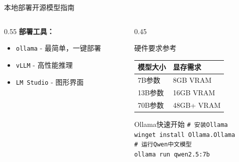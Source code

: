 \documentclass[aspectratio=169,11pt]{beamer}
\begin{document}
\begin{frame}{本地部署开源模型指南}
\begin{columns}
\begin{column}{0.55\textwidth}
            \vspace{0.3cm}
            \textbf{部署工具：}
            \begin{itemize}
                \item \texttt{ollama} - 最简单，一键部署
                \item \texttt{vLLM} - 高性能推理
                \item \texttt{LM Studio} - 图形界面
            \end{itemize}
        \end{column}
        \begin{column}{0.45\textwidth}
            \begin{block}{硬件要求参考}
                \small
                \begin{tabular}{ll}
                    \textbf{模型大小} & \textbf{显存需求} \\
                    \midrule
                    7B参数 & 8GB VRAM \\
                    13B参数 & 16GB VRAM \\
                    70B参数 & 48GB+ VRAM \\
                \end{tabular}
            \end{block}
            
            \vspace{0.3cm}
            \begin{exampleblock}{Ollama快速开始}
                \small
                \texttt{\# 安装Ollama}\\
                \texttt{winget install Ollama.Ollama}\\
                \vspace{0.1cm}
                \texttt{\# 运行Qwen中文模型}\\
                \texttt{ollama run qwen2.5:7b}
            \end{exampleblock}
        \end{column}
    \end{columns}
\end{frame}
\end{document}
